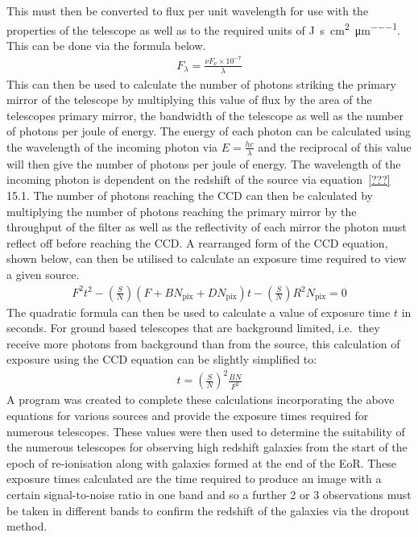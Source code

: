 		This must then be converted to flux per unit wavelength for use with the properties of the telescope as well as to the required units of \si{\joule\per\second\per\square\centi\metre\per\micro\metre}. This can be done via the formula below. %
		\begin{align}
			F_\lambda = \frac{\nu F_\nu \times 10^{-7}}{\lambda} \label{eq:flux_per_unit_frequency}
		\end{align}
		This can then be used to calculate the number of photons striking the primary mirror of the telescope by multiplying this value of flux by the area of the telescopes primary mirror, the bandwidth of the telescope as well as the number of photons per joule of energy. The energy of each photon can be calculated using the wavelength of the incoming photon via $E = \frac{hc}{\lambda}$ and the reciprocal of this value will then give the number of photons per joule of energy. The wavelength of the incoming photon is dependent on the redshift of the source via equation~\ref{???} 15.1. The number of photons reaching the CCD can then be calculated by multiplying the number of photons reaching the primary mirror by the throughput of the filter as well as the reflectivity of each mirror the photon must reflect off before reaching the CCD. A rearranged form of the CCD equation, shown below, can then be utilised to calculate an exposure time required to view a given source.
		\begin{align}
			F^2 t^2 - (\frac{S}{N})(F + BN_\text{pix} + DN_\text{pix})t - (\frac{S}{N})R{^2}N_\text{pix} = 0
		\end{align}
		The quadratic formula can then be used to calculate a value of exposure time $t$ in seconds. For ground based telescopes that are background limited, i.e.\ they receive more photons from background than from the source, this calculation of exposure using the CCD equation can be slightly simplified to:
		\begin{align}
			t = (\frac{S}{N})^2 \frac{BN}{F^2}
		\end{align}
		A program was created to complete these calculations incorporating the above equations for various sources and provide the exposure times required for numerous telescopes. These values were then used to determine the suitability of the numerous telescopes for observing high redshift galaxies from the start of the epoch of re-ionisation along with galaxies formed at the end of the EoR. These exposure times calculated are the time required to produce an image with a certain signal-to-noise ratio in one band and so a further 2 or 3 observations must be taken in different bands to confirm the redshift of the galaxies via the dropout method.

